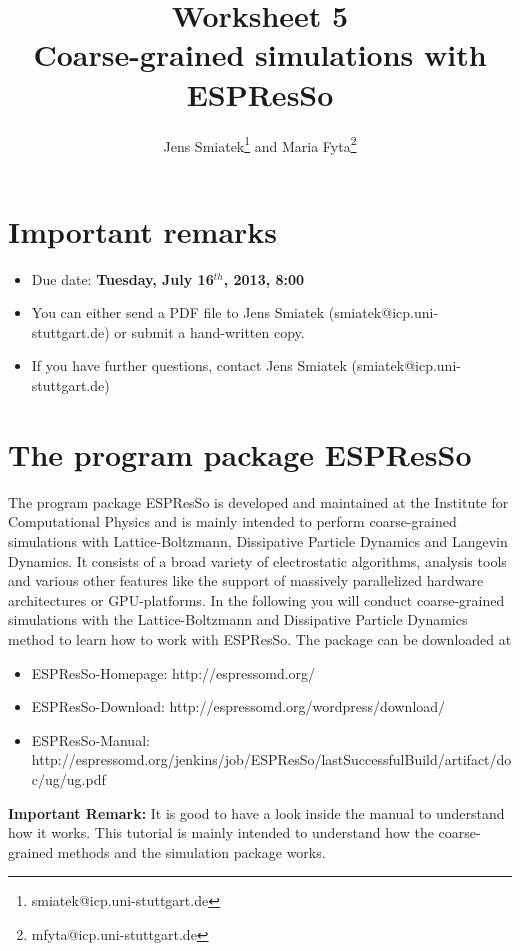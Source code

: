 \documentclass[11pt,a4paper,%
	       headsepline=false, footsepline=false, notitlepage, %
	       bigheadings, %
	       bibtotoc, %
	       final]{scrartcl}
\begin{document}
\titlehead{Simulation Methods in Physics II (SS 2013)}
\title{Worksheet 5\\Coarse-grained simulations with ESPResSo}
\author{Jens Smiatek\thanks{smiatek@icp.uni-stuttgart.de} and Maria Fyta\thanks{mfyta@icp.uni-stuttgart.de}}
\publishers{ICP, Uni Stuttgart}


\maketitle

\section*{Important remarks}
\begin{itemize}
\item Due date: {\bf Tuesday, July 16$^{th}$, 2013, 8:00}  
\item You can either send a PDF file to Jens Smiatek (smiatek@icp.uni-stuttgart.de) or submit a hand-written copy.
\item If you have further questions, contact Jens Smiatek (smiatek@icp.uni-stuttgart.de) 
\end{itemize}

\section*{The program package ESPResSo}
The program package ESPResSo is developed and maintained at the Institute for Computational Physics and 
is mainly intended to perform coarse-grained simulations with Lattice-Boltzmann, Dissipative Particle Dynamics and Langevin Dynamics.
It consists of a broad variety of electrostatic algorithms, analysis tools and various other features like the support of massively parallelized hardware architectures or GPU-platforms.
In the following you will conduct coarse-grained simulations with the Lattice-Boltzmann and Dissipative Particle Dynamics method to learn how to work with ESPResSo.
The package can be downloaded at
\begin{itemize}
\item ESPResSo-Homepage: http://espressomd.org/
\item ESPResSo-Download: http://espressomd.org/wordpress/download/
\item ESPResSo-Manual: http://espressomd.org/jenkins/job/ESPResSo/lastSuccessfulBuild/artifact/doc/ug/ug.pdf
\end{itemize}
{\bf Important Remark:} It is good to have a look inside the manual to understand how it works. This tutorial is mainly intended to understand how the coarse-grained methods and the simulation package works.
\end{document}
